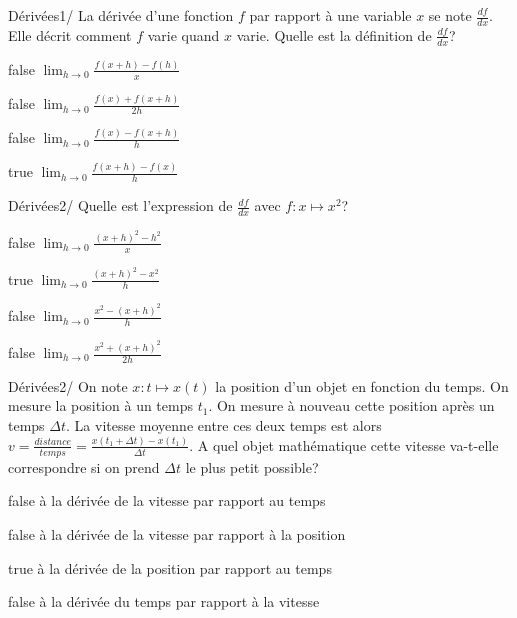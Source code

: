         	\begin{question}{19}{Dérivées}{1}{/}
				La dérivée d'une fonction $f$ par rapport à une variable $x$ se note $\frac{df}{dx}$. Elle décrit comment $f$ varie quand $x$ varie. Quelle est la définition de $\frac{df}{dx}$?
            \end{question}
            \begin{reponses}
            	\item[false] $\lim_{h\to 0} \frac{f(x+h)-f(h)}{x}$
            	\item[false] $\lim_{h\to 0} \frac{f(x)+f(x+h)}{2h}$
                \item[false] $\lim_{h\to 0} \frac{f(x)-f(x+h)}{h}$
                \item[true] $\lim_{h\to 0} \frac{f(x+h)-f(x)}{h}$
            \end{reponses}
            \begin{question}{19}{Dérivées}{2}{/}
                Quelle est l'expression de $\frac{df}{dx}$ avec $f:x\mapsto x^2$?
            \end{question}
            \begin{reponses}
                \item[false] $\lim_{h\to 0} \frac{(x+h)^2-h^2}{x}$
                \item[true] $\lim_{h\to 0} \frac{(x+h)^2-x^2}{h}$
                \item[false] $\lim_{h\to 0} \frac{x^2-(x+h)^2}{h}$
                \item[false] $\lim_{h\to 0} \frac{x^2+(x+h)^2}{2h}$
            \end{reponses}
            \begin{question}{19}{Dérivées}{2}{/}
            	On note $x:t\mapsto x(t)$ la position d'un objet en fonction du temps. On mesure la position à un temps $t_1$. On mesure à nouveau cette position après un temps $\Delta t$. La vitesse moyenne entre ces deux temps est alors $v=\frac{distance}{temps}=\frac{x(t_1+\Delta t)-x(t_1)}{\Delta t}$. A quel objet mathématique cette vitesse va-t-elle correspondre si on prend $\Delta t$ le plus petit possible?
            \end{question}
            \begin{reponses}
                \item[false] à la dérivée de la vitesse par rapport au temps
                \item[false] à la dérivée de la vitesse par rapport à la position
                \item[true] à la dérivée de la position par rapport au temps
                \item[false] à la dérivée du temps par rapport à la vitesse
            \end{reponses}
